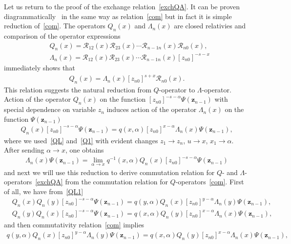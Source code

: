 \documentclass[pdftex]{sigma}
\numberwithin{equation}{section}
\begin{document}
Let us return to the proof of the exchange relation~\eqref{exchQA}.
It can be proven diagrammatically~\cite{DKO, DKM,DM2} in the same
way as relation~\eqref{com} but in fact it is simple
reduction of~\eqref{com}.
The operators $Q_n(x)$ and $\Lambda_n(x)$ are closed relativies and comparison of the operator expressions%
\begin{align*}
&Q_n( x) = \mathcal{R}_{12}(x)\mathcal{R}_{23}(x)\cdots
\mathcal{R}_{n-1 n}(x) \mathcal{R}_{n 0}(x) , \\
&\Lambda_n( x) = \mathcal{R}_{12}(x)\mathcal{R}_{23}(x)\cdots
\mathcal{R}_{n-1 n}(x) [z_{n0}]^{-s-x}
\end{align*}
immediately shows that
\begin{align}\label{QL}
Q_n( x) = \Lambda_n(x) [z_{n0}]^{s+x} \mathcal{R}_{n 0}(x) .
\end{align}
This relation suggests the natural reduction from $Q$-operator to $\Lambda$-operator.
Action of the operator $Q_n( x)$ on the function
$[z_{n 0}]^{-s-\alpha} \Psi(\bm z_{n-1})$ with special
dependence on variable $z_n$ induces action
of the operator $\Lambda_n( x)$ on
the function $\Psi(\bm z_{n-1})$
\begin{align}\label{QL1}
Q_n( x) [z_{n 0}]^{-s-\alpha} \Psi(\bm z_{n-1}) =
q(x,\alpha) [z_{n0}]^{x-\alpha}
\Lambda_n( x) \Psi(\bm z_{n-1}),
\end{align}
where we used~\eqref{QL} and~\eqref{Q1} with evident changes
$z_1 \to z_n$, $u \to x$, $x_1 \to \alpha$.
After sending $\alpha \to x$, one obtains
\begin{align}\label{RedQL}
\Lambda_n( x) \Psi(\bm z_{n-1}) =
\lim\limits_{\alpha\to x} q^{-1}(x,\alpha) Q_n( x) [z_{n 0}]^{-s-\alpha} \Psi(\bm z_{n-1})
\end{align}
and next we will use this reduction to derive commutation
relation for $Q$- and $\Lambda$-operators~\eqref{exchQA} from
the commutation relation for $Q$-operators~\eqref{com}.
First of all, we have from~\eqref{QL1}
\begin{align*}
&Q_n( x) Q_n( y) [z_{n 0}]^{-s-\alpha} \Psi(\bm z_{n-1}) =
q(y,\alpha) Q_n( x) [z_{n 0}]^{y-\alpha} \Lambda_n(y) \Psi(\bm z_{n-1}) ,\\
&Q_n( y) Q_n( x) [z_{n 0}]^{-s-\alpha} \Psi(\bm z_{n-1}) =
q(x,\alpha) Q_n( y) [z_{n 0}]^{x-\alpha} \Lambda_n(x) \Psi(\bm z_{n-1}) ,
\end{align*}
and then commutativity relation~\eqref{com} implies
\begin{align*}
q(y,\alpha) Q_n( x) [z_{n 0}]^{y-\alpha} \Lambda_n(y) \Psi(\bm z_{n-1}) =
q(x,\alpha) Q_n( y) [z_{n 0}]^{x-\alpha} \Lambda_n(x) \Psi(\bm z_{n-1}) ,
\end{align*}
\end{document}
